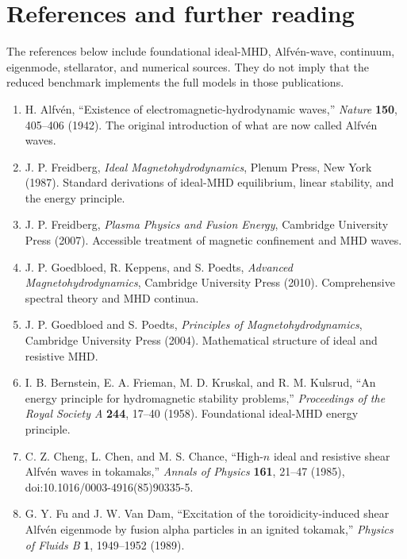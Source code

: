 \section{References and further reading}
\label{sec:references}

The references below include foundational ideal-MHD, Alfv\'en-wave, continuum, eigenmode, stellarator, and numerical sources. They do not imply that the reduced benchmark implements the full models in those publications.

\begin{enumerate}[leftmargin=1.8em]
\item H. Alfv\'en, ``Existence of electromagnetic-hydrodynamic waves,'' \emph{Nature} \textbf{150}, 405--406 (1942). The original introduction of what are now called Alfv\'en waves.

\item J. P. Freidberg, \emph{Ideal Magnetohydrodynamics}, Plenum Press, New York (1987). Standard derivations of ideal-MHD equilibrium, linear stability, and the energy principle.

\item J. P. Freidberg, \emph{Plasma Physics and Fusion Energy}, Cambridge University Press (2007). Accessible treatment of magnetic confinement and MHD waves.

\item J. P. Goedbloed, R. Keppens, and S. Poedts, \emph{Advanced Magnetohydrodynamics}, Cambridge University Press (2010). Comprehensive spectral theory and MHD continua.

\item J. P. Goedbloed and S. Poedts, \emph{Principles of Magnetohydrodynamics}, Cambridge University Press (2004). Mathematical structure of ideal and resistive MHD.

\item I. B. Bernstein, E. A. Frieman, M. D. Kruskal, and R. M. Kulsrud, ``An energy principle for hydromagnetic stability problems,'' \emph{Proceedings of the Royal Society A} \textbf{244}, 17--40 (1958). Foundational ideal-MHD energy principle.

\item C. Z. Cheng, L. Chen, and M. S. Chance, ``High-$n$ ideal and resistive shear Alfv\'en waves in tokamaks,'' \emph{Annals of Physics} \textbf{161}, 21--47 (1985), doi:10.1016/0003-4916(85)90335-5.

\item G. Y. Fu and J. W. Van Dam, ``Excitation of the toroidicity-induced shear Alfv\'en eigenmode by fusion alpha particles in an ignited tokamak,'' \emph{Physics of Fluids B} \textbf{1}, 1949--1952 (1989).


\end{enumerate}
